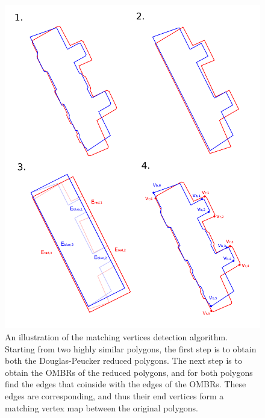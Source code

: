 \documentclass{kththesis}
\begin{document}
\begin{figure}[H]
    \centering
    \includegraphics[width=\textwidth,height=0.5\textheight,keepaspectratio]{img_vertex_match_algo}
    \caption{An illustration of the matching vertices detection algorithm. Starting from two highly similar polygons, the first step is to obtain both the Douglas-Peucker reduced polygons. The next step is to obtain the OMBRs of the reduced polygons, and for both polygons find the edges that coinside with the edges of the OMBRs. These edges are corresponding, and thus their end vertices form a matching vertex map between the original polygons.}
    \label{fig:vertex-match-algo}
\end{figure}
\end{document}
